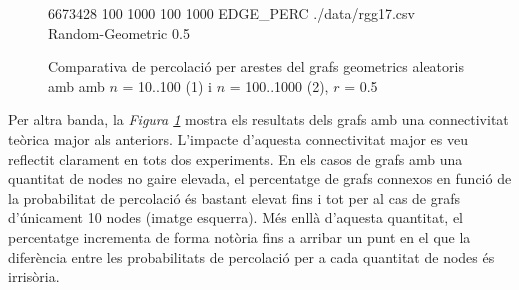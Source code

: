 \documentclass[a4paper]{article}
\begin{document}
\begin{figure}[H]
\begin{minipage}{0.45\textwidth}
			\footnotesize{6673428 100 1000 100 1000 EDGE\_PERC ./data/rgg17.csv Random-Geometric 0.5}
		\end{minipage}
		\caption{Comparativa de percolació per arestes del grafs geometrics aleatoris amb amb $n$ = 10..100 (1) i $n$ = 100..1000 (2), $r$ = 0.5}
		\label{fig:percolation_edges_rgg_0.5}
	\end{figure}
	
	Per altra banda, la \textit{Figura \ref{fig:percolation_edges_rgg_0.5}} mostra els resultats dels grafs amb una connectivitat teòrica major als anteriors. L'impacte d'aquesta connectivitat major es veu reflectit clarament en tots dos experiments. En els casos de grafs amb una quantitat de nodes no gaire elevada, el percentatge de grafs connexos en funció de la probabilitat de percolació és bastant elevat fins i tot per al cas de grafs d'únicament 10 nodes (imatge esquerra). Més enllà d'aquesta quantitat, el percentatge incrementa de forma notòria fins a arribar un punt en el que la diferència entre les probabilitats de percolació per a cada quantitat de nodes és irrisòria. \\
	
\end{document}

